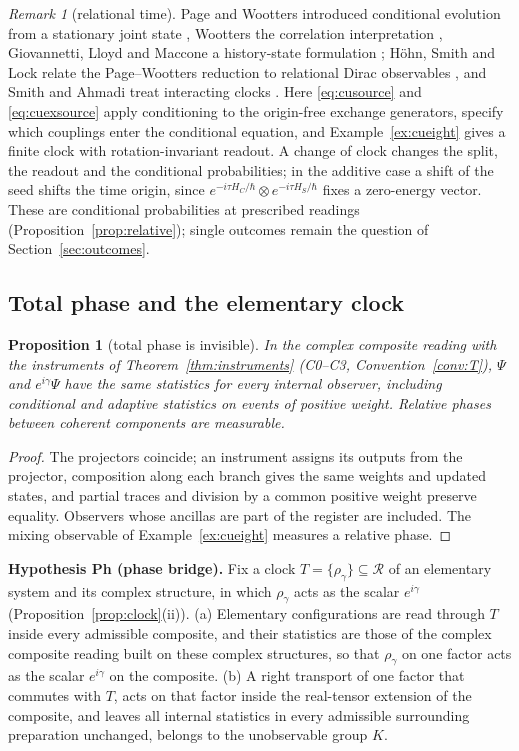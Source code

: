 \documentclass[aps,pra,onecolumn,superscriptaddress,nofootinbib,10pt]{revtex4-2}
\newtheorem{proposition}[theorem]{Proposition}
\theoremstyle{definition}
\theoremstyle{remark}
\newtheorem{remark}[theorem]{Remark}
\newcommand{\cR}{\mathcal{R}}
\begin{document}
\begin{remark}[relational time]\label{rem:cupw}
Page and Wootters introduced conditional evolution from a stationary joint state \cite{n1-pw}, Wootters
the correlation interpretation \cite{n1-wootters}, Giovannetti, Lloyd and Maccone a history-state
formulation \cite{n1-glm}; H\"ohn, Smith and Lock relate the Page--Wootters reduction to relational Dirac
observables \cite{n1-hoehn}, and Smith and Ahmadi treat interacting clocks \cite{n1-smith}.  Here
\eqref{eq:cusource} and \eqref{eq:cuexsource} apply conditioning to the origin-free exchange generators, specify which couplings
enter the conditional equation, and Example~\ref{ex:cueight} gives a finite clock with rotation-invariant readout.  A
change of clock changes the split, the readout and the conditional probabilities; in the additive case a
shift of the seed shifts the time origin, since $e^{-i\tau H_C/\hbar}\otimes e^{-i\tau H_S/\hbar}$ fixes a zero-energy vector.  These are
conditional probabilities at prescribed readings (Proposition~\ref{prop:relative}); single outcomes remain the
question of Section~\ref{sec:outcomes}.
\end{remark}

\subsection{Total phase and the elementary clock}\label{sec:cuphase}

\begin{proposition}[total phase is invisible]\label{prop:cuphase}
In the complex composite reading with the instruments of Theorem~\ref{thm:instruments} (C0--C3, Convention~\ref{conv:T}), $\Psi$ and
$e^{i\gamma}\Psi$ have the same statistics for every internal observer, including conditional and adaptive statistics
on events of positive weight.  Relative phases between coherent components are measurable.
\end{proposition}
\begin{proof}
The projectors coincide; an instrument assigns its outputs from the projector, composition along each
branch gives the same weights and updated states, and partial traces and division by a common positive
weight preserve equality.  Observers whose ancillas are part of the register are included.  The mixing
observable of Example~\ref{ex:cueight} measures a relative phase.
\end{proof}

\smallskip\noindent\textbf{Hypothesis Ph (phase bridge).}\label{hyp:Ph}  Fix a clock $T=\{\rho_\gamma\}\subseteq\cR$ of an elementary system and its
complex structure, in which $\rho_\gamma$ acts as the scalar $e^{i\gamma}$ (Proposition~\ref{prop:clock}(ii)).  (a) Elementary
configurations are read through $T$ inside every admissible composite, and their statistics are those of the
complex composite reading built on these complex structures, so that $\rho_\gamma$ on one factor acts as the scalar
$e^{i\gamma}$ on the composite.  (b) A right transport of one factor that commutes with $T$, acts on that factor inside
the real-tensor extension of the composite, and leaves all internal statistics in every admissible surrounding
preparation unchanged, belongs to the unobservable group $K$.
\end{document}
